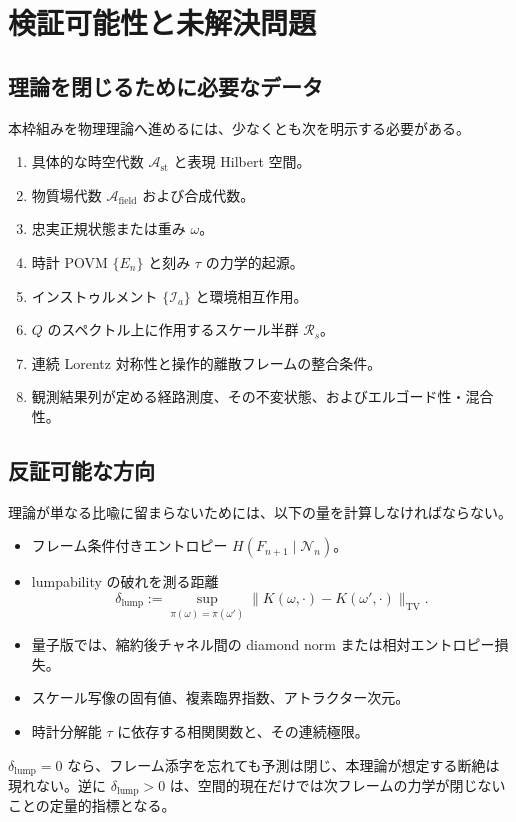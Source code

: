 \documentclass[a4paper,11pt]{ltjsarticle}
\theoremstyle{remark}
\newcommand{\A}{\mathcal{A}}
\newcommand{\N}{\mathcal{N}}
\begin{document}
\section{検証可能性と未解決問題}

\subsection{理論を閉じるために必要なデータ}
本枠組みを物理理論へ進めるには、少なくとも次を明示する必要がある。
\begin{enumerate}
  \item 具体的な時空代数 $\A_{\mathrm{st}}$ と表現 Hilbert 空間。
  \item 物質場代数 $\A_{\mathrm{field}}$ および合成代数。
  \item 忠実正規状態または重み $\omega$。
  \item 時計 POVM $\{E_n\}$ と刻み $\tau$ の力学的起源。
  \item インストゥルメント $\{\mathcal I_a\}$ と環境相互作用。
  \item $Q$ のスペクトル上に作用するスケール半群 $\mathcal R_s$。
  \item 連続 Lorentz 対称性と操作的離散フレームの整合条件。
  \item 観測結果列が定める経路測度、その不変状態、およびエルゴード性・混合性。
\end{enumerate}

\subsection{反証可能な方向}
理論が単なる比喩に留まらないためには、以下の量を計算しなければならない。
\begin{itemize}
  \item フレーム条件付きエントロピー $H(F_{n+1}\mid\N_n)$。
  \item lumpability の破れを測る距離
  \begin{equation}
   \delta_{\mathrm{lump}}
   :=\sup_{\pi(\omega)=\pi(\omega')}
   \lVert K(\omega,\cdot)-K(\omega',\cdot)\rVert_{\mathrm{TV}}.
  \end{equation}
  \item 量子版では、縮約後チャネル間の diamond norm または相対エントロピー損失。
  \item スケール写像の固有値、複素臨界指数、アトラクター次元。
  \item 時計分解能 $\tau$ に依存する相関関数と、その連続極限。
\end{itemize}
$\delta_{\mathrm{lump}}=0$ なら、フレーム添字を忘れても予測は閉じ、本理論が想定する断絶は現れない。逆に $\delta_{\mathrm{lump}}>0$ は、空間的現在だけでは次フレームの力学が閉じないことの定量的指標となる。
\end{document}

